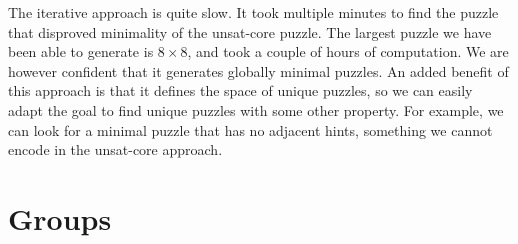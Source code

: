 \documentclass{scrartcl}
\begin{document}
	The iterative approach is quite slow. It took multiple minutes to find the puzzle that disproved minimality of the unsat-core puzzle. The largest puzzle we have been able to generate is $8\times 8$, and took a couple of hours of computation. We are however confident that it generates globally minimal puzzles. An added benefit of this approach is that it defines the space of unique puzzles, so we can easily adapt the goal to find unique puzzles with some other property. For example, we can look for a minimal puzzle that has no adjacent hints, something we cannot encode in the unsat-core approach.


\appendix
\pagebreak
\section{Groups}
\label{apx: groups}
\end{document}

